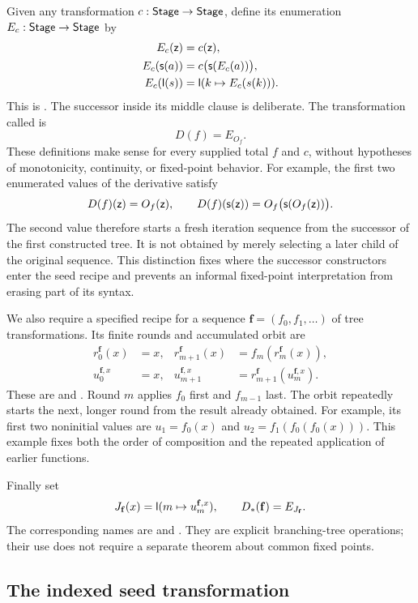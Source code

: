 Given any transformation \(c:\mathsf{Stage}\to\mathsf{Stage}\), define its enumeration
\(E_c:\mathsf{Stage}\to\mathsf{Stage}\) by
\begin{align*}
 E_c(\mathsf z)&=c(\mathsf z),\\
 E_c(\mathsf s(a))&=c\bigl(\mathsf s(E_c(a))\bigr),\\
 E_c(\mathsf l(s))&=\mathsf l(k\mapsto E_c(s(k))).
\end{align*}
This is . The successor inside its middle clause
is deliberate. The transformation called  is
\[
                         D(f)=E_{O_f}.
\]
These definitions make sense for every supplied total \(f\) and \(c\),
without hypotheses of monotonicity, continuity, or fixed-point behavior.
For example, the first two enumerated values of the derivative satisfy
\[
 D(f)(\mathsf z)=O_f(\mathsf z),\qquad
 D(f)(\mathsf s(\mathsf z))=O_f\bigl(\mathsf s(O_f(\mathsf z))\bigr).
\]
The second value therefore starts a fresh iteration sequence from the
successor of the first constructed tree. It is not obtained by merely
selecting a later child of the original sequence. This distinction fixes
where the successor constructors enter the seed recipe and prevents an
informal fixed-point interpretation from erasing part of its syntax.

We also require a specified recipe for a sequence
\(\mathbf f=(f_0,f_1,\ldots)\) of tree transformations. Its finite rounds
and accumulated orbit are
\begin{align*}
 r^{\mathbf f}_0(x)&=x,
 &r^{\mathbf f}_{m+1}(x)&=f_m(r^{\mathbf f}_m(x)),\\
 u^{\mathbf f,x}_0&=x,
 &u^{\mathbf f,x}_{m+1}&=
       r^{\mathbf f}_{m+1}(u^{\mathbf f,x}_m).
\end{align*}
These are  and . Round \(m\)
applies \(f_0\) first and \(f_{m-1}\) last. The orbit repeatedly starts
the next, longer round from the result already obtained. For example,
its first two noninitial values are
\(u_1=f_0(x)\) and \(u_2=f_1(f_0(f_0(x)))\).
This example fixes both the order of composition and the repeated
application of earlier functions.

Finally set
\[
 J_{\mathbf f}(x)=\mathsf l(m\mapsto u^{\mathbf f,x}_m),
 \qquad D_*(\mathbf f)=E_{J_{\mathbf f}}.
\]
The corresponding names are  and
. They are explicit branching-tree operations;
their use does not require a separate theorem about common fixed points.

\subsection{The indexed seed transformation}

